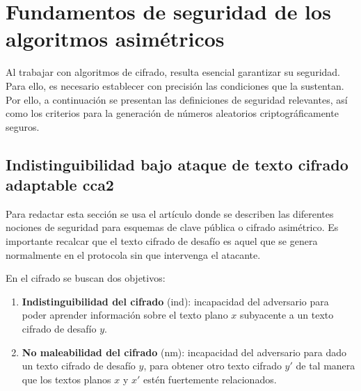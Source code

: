 \section{Fundamentos de seguridad de los algoritmos asimétricos}
Al trabajar con algoritmos de cifrado, resulta esencial garantizar su seguridad. Para ello, es necesario establecer con precisión las condiciones que la sustentan. Por ello, a continuación se presentan las definiciones de seguridad relevantes, así como los criterios para la generación de números aleatorios criptográficamente seguros.

\subsection{Indistinguibilidad bajo ataque de texto cifrado adaptable \acrshort{cca2}}
Para redactar esta sección se usa el artículo \cite{CCA2} donde se describen las diferentes nociones de seguridad para esquemas de clave pública o cifrado asimétrico. Es importante recalcar que el texto cifrado de desafío es aquel que se genera normalmente en el protocola sin que intervenga el atacante.
\newline

En el cifrado se buscan dos objetivos:
\begin{enumerate}
	\item \textbf{Indistinguibilidad del cifrado} (\acrshort{ind}): incapacidad del adversario para poder aprender información sobre el texto plano \(x\) subyacente a un texto cifrado de desafío \(y\).
	\item \textbf{No maleabilidad del cifrado} (\acrshort{nm}): incapacidad del adversario para dado un texto cifrado de desafío \(y\), para obtener otro texto cifrado \(y'\) de tal manera que los textos planos \(x\) y \(x'\) estén fuertemente relacionados.
\end{enumerate}
\newline

